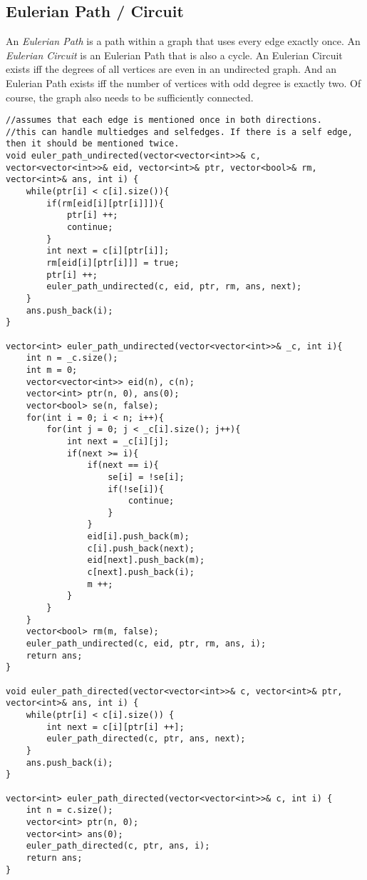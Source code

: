 \documentclass[8pt, headheight=10pt, a4paper]{article}
\begin{document}
\begin{multicols*}{3}
\subsection{Eulerian Path / Circuit}
An \textit{Eulerian Path} is a path within a graph that uses every edge exactly once. An \textit{Eulerian Circuit} is an Eulerian Path that is also a cycle. An Eulerian Circuit exists iff the degrees of all vertices are even in an undirected graph. And an Eulerian Path exists iff the number of vertices with odd degree is exactly two. Of course, the graph also needs to be sufficiently connected. 
\begin{lstlisting}
//assumes that each edge is mentioned once in both directions. 
//this can handle multiedges and selfedges. If there is a self edge, then it should be mentioned twice. 
void euler_path_undirected(vector<vector<int>>& c, vector<vector<int>>& eid, vector<int>& ptr, vector<bool>& rm, vector<int>& ans, int i) {
    while(ptr[i] < c[i].size()){
        if(rm[eid[i][ptr[i]]]){
            ptr[i] ++;
            continue;
        }
        int next = c[i][ptr[i]];
        rm[eid[i][ptr[i]]] = true;
        ptr[i] ++;
        euler_path_undirected(c, eid, ptr, rm, ans, next);
    }
    ans.push_back(i);
}

vector<int> euler_path_undirected(vector<vector<int>>& _c, int i){
    int n = _c.size();
    int m = 0;
    vector<vector<int>> eid(n), c(n);
    vector<int> ptr(n, 0), ans(0);
    vector<bool> se(n, false);
    for(int i = 0; i < n; i++){
        for(int j = 0; j < _c[i].size(); j++){
            int next = _c[i][j];
            if(next >= i){
                if(next == i){
                    se[i] = !se[i];
                    if(!se[i]){
                        continue;
                    }
                }
                eid[i].push_back(m);
                c[i].push_back(next);
                eid[next].push_back(m);
                c[next].push_back(i);
                m ++;
            }
        }
    }
    vector<bool> rm(m, false);
    euler_path_undirected(c, eid, ptr, rm, ans, i);
    return ans;
}

void euler_path_directed(vector<vector<int>>& c, vector<int>& ptr, vector<int>& ans, int i) {
    while(ptr[i] < c[i].size()) {
        int next = c[i][ptr[i] ++];
        euler_path_directed(c, ptr, ans, next);
    }
    ans.push_back(i);
}

vector<int> euler_path_directed(vector<vector<int>>& c, int i) {
    int n = c.size();
    vector<int> ptr(n, 0);
    vector<int> ans(0);
    euler_path_directed(c, ptr, ans, i);
    return ans;
}
\end{lstlisting}


\end{multicols*}
\end{document}

